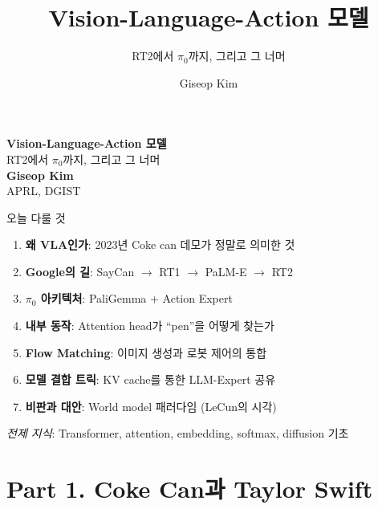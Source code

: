 \documentclass[aspectratio=169,10pt]{beamer}
\title{Vision-Language-Action 모델}
\subtitle{RT2에서 $\pi_0$까지, 그리고 그 너머}
\author{Giseop Kim}
\institute{APRL, DGIST}
\date{}
\begin{document}
{
\begin{frame}[plain]
\vspace*{1.5cm}
\begin{center}
{\LARGE\textbf{Vision-Language-Action 모델}}\\[0.3cm]
{\large RT2에서 $\pi_0$까지, 그리고 그 너머}\\[1.5cm]
\textbf{Giseop Kim}\\[0.2cm]
{\small APRL, DGIST}
\end{center}
\end{frame}
}

\begin{frame}{오늘 다룰 것}
\begin{enumerate}
  \item \textbf{왜 VLA인가}: 2023년 Coke can 데모가 정말로 의미한 것
  \item \textbf{Google의 길}: SayCan $\to$ RT1 $\to$ PaLM-E $\to$ RT2
  \item \textbf{$\pi_0$ 아키텍처}: PaliGemma + Action Expert
  \item \textbf{내부 동작}: Attention head가 ``pen''을 어떻게 찾는가
  \item \textbf{Flow Matching}: 이미지 생성과 로봇 제어의 통합
  \item \textbf{모델 결합 트릭}: KV cache를 통한 LLM-Expert 공유
  \item \textbf{비판과 대안}: World model 패러다임 (LeCun의 시각)
\end{enumerate}

\vspace{1em}
\footnotesize
\textit{전제 지식}: Transformer, attention, embedding, softmax, diffusion 기초
\end{frame}

\section{Part 1. Coke Can과 Taylor Swift}
\end{document}
